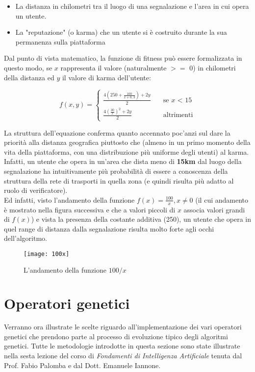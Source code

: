     \begin{itemize}
        \item La distanza in chilometri tra il luogo di una segnalazione e l'area in cui opera un utente.
        \item La "reputazione" (o karma) che un utente si è costruito durante la sua permanenza sulla piattaforma
    \end{itemize}

    Dal punto di vista matematico, la funzione di fitness può essere formalizzata in questo modo, se $x$ rappresenta il valore (naturalmente $>=$ 0) in chilometri della distanza ed $y$ il valore di karma dell'utente:

    \[ f(x, y) =
  \begin{cases}
    \frac{4(250 + \frac{100}{x+0,3}) + 2y}{2}      & \quad \text{se } x \text{ < 15}\\
    \frac{4(\frac{30}{x})^2 + 2y}{2}  & \quad \text{altrimenti}
  \end{cases}
\]

La struttura dell'equazione conferma quanto accennato poc'anzi sul dare la priorità alla distanza geografica piuttosto che (almeno in un primo momento della vita della piattaforma, con una distribuzione più uniforme degli utenti) al karma. Infatti, un utente che opera in un'area che dista meno di \textbf{15km} dal luogo della segnalazione ha intuitivamente più probabilità di essere a conoscenza della struttura della rete di trasporti in quella zona (e quindi risulta più adatto al ruolo di verificatore). \\
Ed infatti, visto l'andamento della funzione $f(x) = \frac{100}{x}, x \neq 0$ (il cui andamento è mostrato nella figura successiva e che a valori piccoli di $x$ associa valori grandi di $f(x)$) e vista la presenza della costante additiva (250), un utente che opera in quel range di distanza dalla segnalazione risulta molto forte agli occhi dell'algoritmo.
\begin{figure}[h!]
    \begin{center}
        \texttt{[image: 100x]}
    \end{center}
    \caption{L'andamento della funzione $100/x$}
    \label{fig: L'andamento della funzione $100/x$}
\end{figure}


\section{Operatori genetici}
  Verranno ora illustrate le scelte riguardo all'implementazione dei vari operatori genetici che prendono parte al processo di evoluzione tipico degli algoritmi genetici. Tutte le metodologie introdotte in questa sezione sono state illustrate nella sesta lezione del corso di \textit{Fondamenti di Intelligenza Artificiale} tenuta dal Prof. Fabio Palomba e dal Dott. Emanuele Iannone.

